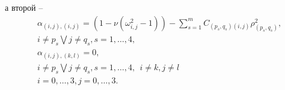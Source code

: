 \documentclass[12pt]{article}  %
\begin{document}
а второй \---
\begin{equation}
\begin{split}
&\alpha_{(i,j),(i,j)} = (1-\nu(\omega^2_{i,j}-1)) - \sum_{s=1}^{m}C_{(p_s,q_s)(i,j)}\rho^2_{(p_s,q_s)}, \\
&i\not=p_s \bigvee j\not=q_s, s=1,\dots,4,\\
&\alpha_{(i,j),(k,l)}=0,\\
&i\not=p_s \bigvee j\not=q_s, s=1,\dots,4, \ \ i\not=k, j\not=l\\
&i=0,\dots,3,j=0,\dots,3.
\end{split}
\end{equation}
\end{document}
